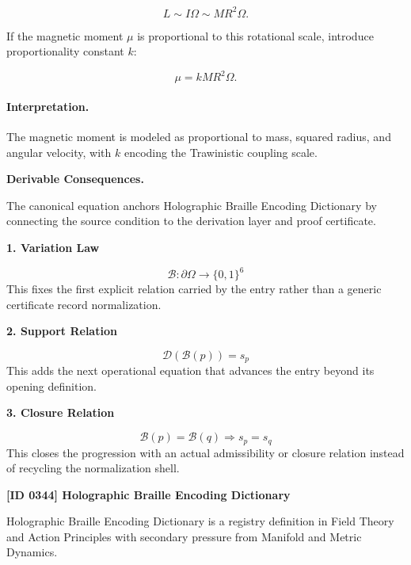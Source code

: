 \begin{equation}
L
\sim
I\Omega
\sim
MR^2\Omega .
\end{equation}

If the magnetic moment $\mu$ is proportional to this rotational scale, introduce proportionality constant $k$:

\begin{equation}
\boxed{
\mu
=
kMR^2\Omega .
}
\end{equation}

\paragraph{Interpretation.}
The magnetic moment is modeled as proportional to mass, squared radius, and angular velocity, with $k$ encoding the Trawinistic coupling scale.

\par\vspace{0.35em}
\noindent\textbf{Derivable Consequences.}\quad
\begingroup
\footnotesize
\raggedright
The canonical equation anchors Holographic Braille Encoding Dictionary by connecting the source condition to the derivation layer and proof certificate.
\par\endgroup

\noindent\textbf{1. Variation Law}\par
\[
\mathcal{B}:\partial\Omega\to\{0,1\}^{6}
\]
\noindent This fixes the first explicit relation carried by the entry rather than a generic certificate record normalization.\par
\noindent\textbf{2. Support Relation}\par
\[
\mathcal{D}(\mathcal{B}(p))=s_{p}
\]
\noindent This adds the next operational equation that advances the entry beyond its opening definition.\par
\noindent\textbf{3. Closure Relation}\par
\[
\mathcal{B}(p)=\mathcal{B}(q)\Longrightarrow s_{p}=s_{q}
\]
\noindent This closes the progression with an actual admissibility or closure relation instead of recycling the normalization shell.\par

\clearpage
\noindent\textbf{[ID 0344] Holographic Braille Encoding Dictionary}\par
\vspace{0.35em}
\begingroup\small
{}
Holographic Braille Encoding Dictionary is a registry definition in Field Theory and Action Principles with secondary pressure from Manifold and Metric Dynamics.

